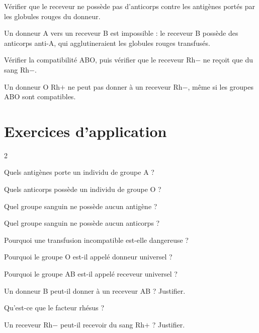 Vérifier que le receveur ne possède pas d'anticorps contre les antigènes portés par les
globules rouges du donneur.
\begin{exemple}
Un donneur A vers un receveur B est impossible : le receveur B possède des anticorps
anti-A, qui agglutineraient les globules rouges transfusés.
\end{exemple}

Vérifier la compatibilité ABO, puis vérifier que le receveur Rh$-$ ne reçoit que du sang
Rh$-$.
\begin{exemple}
Un donneur O Rh$+$ ne peut pas donner à un receveur Rh$-$, même si les groupes ABO sont
compatibles.
\end{exemple}

\section{Exercices d'application}
\begin{multicols}{2}

\exo{} Quels antigènes porte un individu de groupe A ?

\exo{} Quels anticorps possède un individu de groupe O ?

\exo{} Quel groupe sanguin ne possède aucun antigène ?

\exo{} Quel groupe sanguin ne possède aucun anticorps ?

\exo{} Pourquoi une transfusion incompatible est-elle dangereuse ?

\exo{} Pourquoi le groupe O est-il appelé donneur universel ?

\exo{} Pourquoi le groupe AB est-il appelé receveur universel ?

\exo{} Un donneur B peut-il donner à un receveur AB ? Justifier.

\exo{} Qu'est-ce que le facteur rhésus ?

\exo{} Un receveur Rh$-$ peut-il recevoir du sang Rh$+$ ? Justifier.

\end{multicols}

